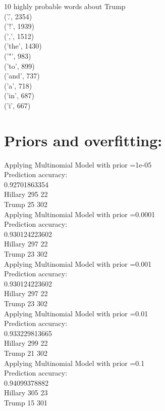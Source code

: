 \documentclass[]{article}
\begin{document}
\begin{enumerate}
		 10 highly probable words about Trump\\
		 ('.', 2354)\\
		 ('!', 1939)\\
		 (',', 1512)\\
		 ('the', 1430)\\
		 ('"', 983)\\
		 ('to', 899)\\
		 ('and', 737)\\
		 ('a', 718)\\
		 ('in', 687)\\
		 ('i', 667)
\end{enumerate}

\section{Priors and overfitting:}


Applying Multinomial Model with prior =1e-05\\
Prediction accuracy:\\
0.92701863354\\
Hillary     295 22\\
Trump       25 302\\

Applying Multinomial Model with prior =0.0001\\
Prediction accuracy:\\
0.930124223602\\
Hillary     297 22\\
Trump       23 302\\

Applying Multinomial Model with prior =0.001\\
Prediction accuracy:\\
0.930124223602\\
Hillary     297 22\\
Trump       23 302\\

Applying Multinomial Model with prior =0.01\\
Prediction accuracy:\\
0.933229813665\\
Hillary     299 22\\
Trump       21 302\\

Applying Multinomial Model with prior =0.1\\
Prediction accuracy:\\
0.94099378882\\
Hillary     305 23\\
Trump       15 301\\
\end{document}
